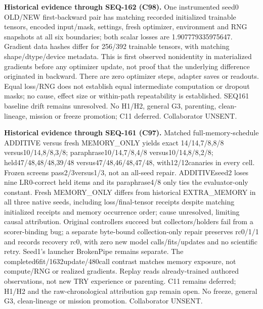 \documentclass[11pt]{article}
\begin{document}
\noindent\textbf{Historical evidence through SEQ-162 (C98).}
One instrumented seed0 OLD/NEW first-backward pair has matching recorded
initialized trainable tensors, encoded input/mask, settings, fresh optimizer,
environment and RNG snapshots at all six boundaries; both scalar losses are
1.907779335975647. Gradient data hashes differ for 256/392 trainable tensors,
with matching shape/dtype/device metadata. This is first observed nonidentity
in materialized gradients before any optimizer update, not proof that the
underlying difference originated in backward. There are zero optimizer steps,
adapter saves or readouts. Equal loss/RNG does not establish equal intermediate
computation or dropout masks; no cause, effect size or within-path repeatability
is established. SEQ161 baseline drift remains unresolved. No H1/H2, general G3,
parenting, clean-lineage, mission or freeze promotion; C11 deferred. Collaborator UNSENT.

\noindent\textbf{Historical evidence through SEQ-161 (C97).}
Matched full-memory-schedule ADDITIVE versus fresh MEMORY\_ONLY yields exact
14/14,7/8,8/8 versus10/14,8/8,3/8; paraphrase10/14,7/8,4/8 versus10/14,8/8,2/8;
held47/48,48/48,39/48 versus47/48,46/48,47/48, with12/12canaries in every cell.
Frozen screens pass2/3versus1/3, not an all-seed repair. ADDITIVEseed2 loses nine
LR0-correct held items and its paraphrase4/8 only ties the evaluator-only constant.
Fresh MEMORY\_ONLY differs from historical EXTRA\_MEMORY in all three native seeds,
including loss/final-tensor receipts despite matching initialized receipts and
memory occurrence order; cause unresolved, limiting causal attribution.
Original controllers succeed but collectors/holders fail from a scorer-binding
bug; a separate byte-bound collection-only repair preserves rc0/1/1 and records
recovery rc0, with zero new model calls/fits/updates and no scientific retry.
Seed1's launcher BrokenPipe remains separate. The completed6fit/1632update/480call
contrast matches memory exposure, not compute/RNG or realized gradients. Replay
reads already-trained authored observations, not new TRY experience or parenting.
C11 remains deferred; H1/H2 and the raw-chronological attribution gap remain open.
No freeze, general G3, clean-lineage or mission promotion. Collaborator UNSENT.
\end{document}
